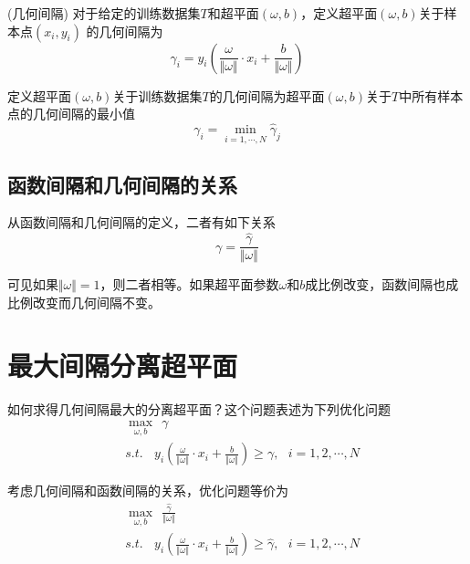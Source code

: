 \begin{define}
    (几何间隔) 对于给定的训练数据集$T$和超平面$(\omega,b)$，定义超平面$(\omega,b)$关于样本点$(x_i,y_i)$
    的几何间隔为
    \begin{equation}
        \gamma_i=y_i(\frac{\omega}{\Vert \omega\Vert}\cdot x_i+\frac{b}{\Vert \omega\Vert})
    \end{equation}

    定义超平面$(\omega,b)$关于训练数据集$T$的几何间隔为超平面$(\omega,b)$关于$T$中所有样本点的几何间隔的最小值
    \begin{equation}
        \gamma_i=\min\limits_{i=1,\cdots,N} \hat{\gamma}_j
    \end{equation}
\end{define}

\subsection*{函数间隔和几何间隔的关系}

从函数间隔和几何间隔的定义，二者有如下关系
\begin{equation}
    \gamma=\frac{\hat{\gamma}}{\Vert \omega\Vert}
\end{equation}

可见如果$\Vert \omega\Vert=1$，则二者相等。如果超平面参数$\omega$和$b$成比例改变，函数间隔也成比例改变而几何间隔不变。

\section{最大间隔分离超平面}

如何求得几何间隔最大的分离超平面？这个问题表述为下列优化问题
\begin{equation}
    \begin{aligned}
    &\max\limits_{\omega,b}\ \ \gamma\\
    &s.t.\ \ \ \ y_i(\frac{\omega}{\Vert \omega\Vert}\cdot x_i+\frac{b}{
        \Vert \omega\Vert})\geqslant \gamma,\ \ \ i=1,2,\cdots,N
\end{aligned}
\end{equation}

考虑几何间隔和函数间隔的关系，优化问题等价为
\begin{equation}
    \begin{aligned}
    &\max\limits_{\omega,b}\ \ \frac{\hat{\gamma}}{\Vert \omega\Vert}\\
    &s.t.\ \ \ \ y_i(\frac{\omega}{\Vert \omega\Vert}\cdot x_i+\frac{b}{
        \Vert \omega\Vert})\geqslant \hat{\gamma},\ \ \ i=1,2,\cdots,N
\end{aligned}
\end{equation}

